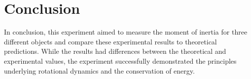 \documentclass{report}
\begin{document}
    \bigbreak \noindent 
    \section{Conclusion}
    \bigbreak \noindent 
    In conclusion, this experiment aimed to measure the moment of inertia for three different objects and compare these experimental results to theoretical predictions. While the results had differences between the theoretical and experimental values, the experiment successfully demonstrated the principles underlying rotational dynamics and the conservation of energy. 










    
\end{document}
